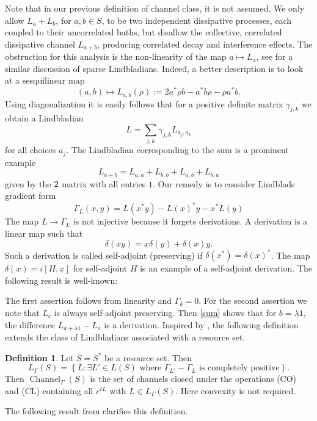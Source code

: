 \documentclass[11pt,reqno]{amsart}
\theoremstyle{definition}
\newtheorem{lemma}[theorem]{Lemma}
\newtheorem{definition}[theorem]{Definition}
\newcommand{\lset}{\left\{ }
\newcommand{\rset}{\right\} }
\DeclareMathOperator{\chan}{Channel}
\begin{document}
Note that in our previous definition of channel class, it is not assumed. 
We only allow $L_a+L_b$, for $a,b\in S$, to be two independent dissipative processes, each coupled to their uncorrelated baths, but disallow the collective, correlated dissipative channel $L_{a+b}$, producing correlated decay and interference effects.
The obstruction for this analysis is the non-linearity of the map $a\mapsto L_a$, see \cite{childs2016} for a similar discussion of sparse Lindbladians. Indeed, a better description is to look at a sesquilinear map 
 \[ (a,b) \mapsto L_{a,b}(\rho) := 2a^*\rho b-a^*b\rho-\rho a^*b  .\]
Using diagonalization it is easily follows that for a positive definite matrix $\gamma_{j,k}$ we obtain a Lindbladian 
 \[ L = \sum_{j,k} \gamma_{j,k} L_{a_j,a_k} \]
for all choices $a_j$. The Lindbladian corresponding to the sum is a prominent example 
\begin{equation}\label{sum}
 L_{a+b} = L_{a,a} + L_{b,b}+L_{a,b}+ L_{b,a} 
\end{equation}
given by the $2\time 2$ matrix with all entries $1$.
Our remedy is to consider Lindblads gradient form 
 \[ \Gamma_{L}(x,y) = L(x^*y)-L(x)^*y-x^*L(y)  \] 
The map $L\to \Gamma_{L}$ is not injective because it forgets derivations. A derivation is a linear map such that 
 \[ \delta(xy) = x\delta(y)+\delta(x)y  .\] 
Such a derivation is called self-adjoint (preserving) if $\delta(x^*)=\delta(x)^*$. The map $\delta(x)=i[H,x]$ for self-adjoint $H$ is an example of a self-adjoint derivation. The following result is well-known:


The first assertion follows from linearity and $\Gamma_{\delta}=0$. For the second assertion we note that $L_c$ is always self-adjoint preserving. Then \eqref{sum} 
shows that for $b=\lambda 1$, the difference $L_{a+\lambda 1}-L_{a}$ is a derivation. Inspired by \cite{group_gradient_flow}, the following definition extends the class of Lindbladians associated with a resource set. 

\begin{definition}
    Let $S=S^*$ be a resource set. Then
    \[ L_{\Gamma}(S) = \lset L  : \exists{L'\in L(S)}  \text{ where } \Gamma_{L'} - \Gamma_{L} \text{ is completely positive} \rset   .\] 
    Then $\chan_{\Gamma}(S)$ is the set of channels closed under the operations (CO) and (CL) containing all $e^{tL}$ with $L\in L_{\Gamma}(S)$. Here convexity is not required.
\end{definition} 
The following result from \cite{JW} clarifies this definition. 
\end{document}
